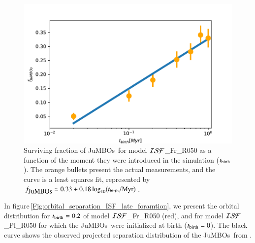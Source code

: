 \documentclass[submission,phys]{lib/SciPost}
\newcommand{\jumbos}{\mbox{JuMBOs}}
\begin{document}
\begin{figure}
    \centering
    \includegraphics[width=0.75\columnwidth]{figures/fig_survival_fraction_ISF_late_foramtion.pdf}
    \caption{Surviving fraction of \jumbos\, for model ${\cal
        ISF}$\_Fr\_R050 as a function of the moment they were
      introduced in the simulation ($t_{\rm birth}$).  The orange
      bullets present the actual measurements, and the curve is a
      least squares fit, represented by $f_{\jumbos} \simeq 0.33 +
      0.18\log_{10}(t_{\rm birth}/{\rm Myr})$.}
    \label{Fig:survival_fraction_ISF_late_foramtion}
\end{figure}
  

In figure\,\ref{Fig:orbital_separation_ISF_late_foramtion}, we present
the orbital distribution for $t_{\rm birth} = 0.2$ of model ${\cal
  ISF}$\_Fr\_R050 (red), and for model ${\cal ISF}$\_Pl\_R050 for
which the \jumbos\, were initialized at birth ($t_{\rm birth} =
0$). The black curve shows the observed projected separation
distribution of the \jumbos\, from \cite{2023arXiv231001231P}.
\end{document}
